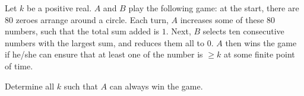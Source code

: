 Let $k$ be a positive real. $A$ and $B$ play the following game: at the start, there are $80$ zeroes arrange around a circle. Each turn, $A$ increases some of these $80$ numbers, such that the total sum added is $1$. Next, $B$ selects ten consecutive numbers with the largest sum, and reduces them all to $0$. $A$ then wins the game if he/she can ensure that at least one of the number is $\geq k$ at some finite point of time.

Determine all $k$ such that $A$ can always win the game.